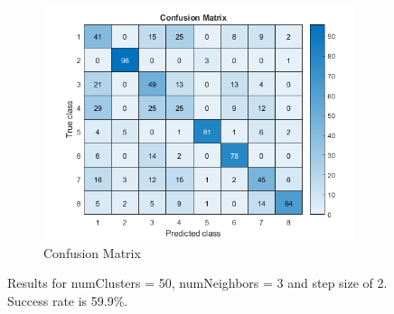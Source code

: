 \begin{figure}[h]
\begin{subfigure}{0.3\textwidth}
	\end{subfigure}
	\begin{subfigure}{0.65\textwidth}
		\includegraphics[width=\textwidth]{figures/confusion_50C_3NN_2S.png}
		\caption{Confusion Matrix}
	\end{subfigure}
	\caption{Results for numClusters = 50, numNeighbors = 3 and step size of 2. Success rate is 59.9\%.}
	\label{fig:a5:50c3nn2s}
\end{figure}
